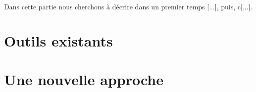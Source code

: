 \label{resultats}

Dans cette partie nous cherchons à décrire dans un premier temps [...], puis, c[...].

\section{Outils existants}
\section{Une nouvelle approche}
